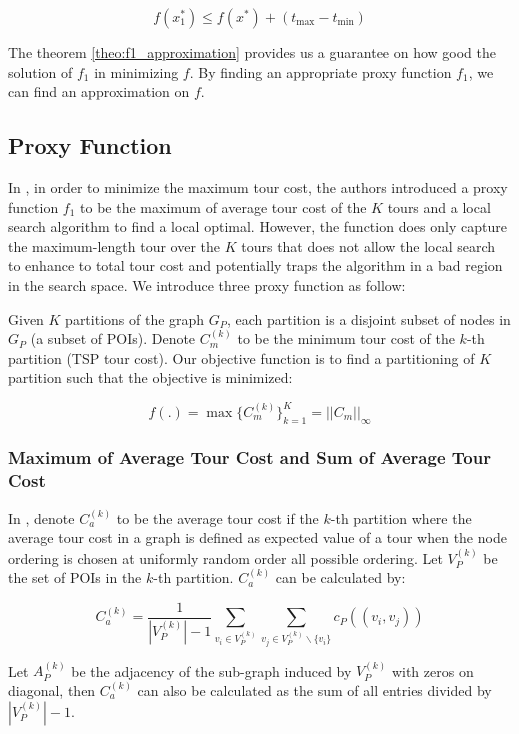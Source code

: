 \begin{theorem}[$f_1$ approximation]
\[
    f(x^*_1) \leq f(x^*) + (t_{\max} - t_{\min})
\]
\label{theo:f1_approximation}
\end{theorem}

The theorem \ref{theo:f1_approximation} provides us a guarantee on how good the solution of $f_1$ in minimizing $f$. By finding an appropriate proxy function $f_1$, we can find an approximation on $f$.

\subsection{Proxy Function}

In \cite{vandermeulen2019balanced}, in order to minimize the maximum tour cost, the authors introduced a proxy function $f_1$ to be the maximum of average tour cost of the $K$ tours and a local search algorithm to find a local optimal. However, the function does only capture the maximum-length tour over the $K$ tours that does not allow the local search to enhance to total tour cost and potentially traps the algorithm in a bad region in the search space. We introduce three proxy function as follow:

Given $K$ partitions of the graph $G_P$, each partition is a disjoint subset of nodes in $G_P$ (a subset of POIs). Denote $C_m^{(k)}$ to be the minimum tour cost of the $k$-th partition (TSP tour cost). Our objective function is to find a partitioning of $K$ partition such that the objective is minimized:

\[
f(.) = \max\{C_m^{(k)}\}_{k=1}^{K} = ||C_m||_\infty
\]

\subsubsection{Maximum of Average Tour Cost and Sum of Average Tour Cost}

In \cite{vandermeulen2019balanced}, denote $C_a^{(k)}$ to be the average tour cost if the $k$-th partition where the average tour cost in a graph is defined as expected value of a tour when the node ordering is chosen at uniformly random order all possible ordering. Let $V_P^{(k)}$ be the set of POIs in the $k$-th partition. $C_a^{(k)}$ can be calculated by:

\[
C_a^{(k)} = \frac{1}{|V_P^{(k)}| - 1} \sum_{v_i \in V_P^{(k)}} \sum_{v_j \in V_P^{(k)} \backslash \{v_i\}} c_P((v_i, v_j))
\]

Let $A_P^{(k)}$ be the adjacency of the sub-graph induced by $V_P^{(k)}$ with zeros on diagonal, then $C_a^{(k)}$ can also be calculated as the sum of all entries divided by $|V_P^{(k)}| - 1$.

